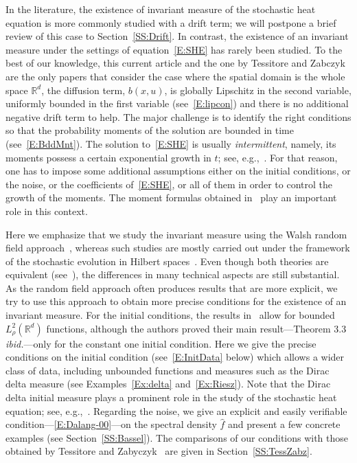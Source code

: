 \documentclass[a4paper,11pt]{article}%
\theoremstyle{plain}
\theoremstyle{definition}
\numberwithin{equation}{section}
\newcommand{\R}{\mathbb{R}}
\begin{document}
In the literature, the existence of invariant measure of the stochastic heat equation is more
commonly studied with a drift term; we will postpone a brief review of this case to
Section~\ref{SS:Drift}. In contrast, the existence of an invariant measure under the settings of
equation~\eqref{E:SHE} has rarely been studied. To the best of our knowledge, this current article
and the one by Tessitore and Zabczyk~\cite{tessitore.zabczyk:98:invariant} are the only papers that
consider the case where the spatial domain is the whole space $\R^d$, the diffusion term, $b(x,u)$,
is globally Lipschitz in the second variable, uniformly bounded in the first variable
(see~\eqref{E:lipcon}) and there is no additional negative drift term to help. The major challenge
is to identify the right conditions so that the probability moments of the solution are bounded in
time (see~\eqref{E:BddMnt}). The solution to~\eqref{E:SHE} is usually \textit{intermittent}, namely,
its moments possess a certain exponential growth in $t$; see,
e.g.,~\cite{carmona.molchanov:94:parabolic,foondun.khoshnevisan:09:intermittence}. For that reason,
one has to impose some additional assumptions either on the initial conditions, or the noise, or the
coefficients of~\eqref{E:SHE}, or all of them in order to control the growth of the moments. The
moment formulas obtained in~\cite{chen.huang:19:comparison,chen.kim:19:nonlinear} play an important
role in this context.

Here we emphasize that we study the invariant measure using the Walsh random field
approach~\cite{walsh:86:introduction}, whereas such studies are mostly carried out under the
framework of the stochastic evolution in Hilbert spaces~\cite{da-prato.zabczyk:14:stochastic}. Even
though both theories are equivalent (see~\cite{dalang.quer-sardanyons:11:stochastic}), the
differences in many technical aspects are still substantial. As the random field approach often
produces results that are more explicit, we try to use this approach to obtain more precise
conditions for the existence of an invariant measure. For the initial conditions, the results
in~\cite{tessitore.zabczyk:98:invariant} allow for bounded $L_\rho^2 (\R^d)$ functions, although the
authors proved their main result---Theorem 3.3 \textit{ibid.}---only for the constant one initial
condition. Here we give the precise conditions on the initial condition (see~\eqref{E:InitData}
below) which allows a wider class of data, including unbounded functions and measures such as the
Dirac delta measure (see Examples~\ref{Ex:delta} and~\ref{Ex:Riesz}). Note that the Dirac delta
initial measure plays a prominent role in the study of the stochastic heat equation; see,
e.g.,~\cite{amir.corwin.ea:11:probability}. Regarding the noise, we give an explicit and easily
verifiable condition---\eqref{E:Dalang-00}---on the spectral density $\widehat{f}$ and present a few
concrete examples (see Section~\ref{SS:Bassel}). The comparisons of our conditions with those
obtained by Tessitore and Zabyczyk~\cite{tessitore.zabczyk:98:invariant} are given in
Section~\ref{SS:TessZabz}.
\end{document}
